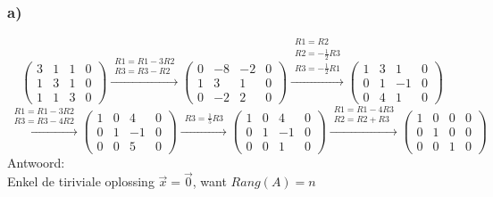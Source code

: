\documentclass[11pt]{article}
\begin{document}
\subsubsection*{a)}
\[
\left(
\begin{array}{ccc|c}
3 & 1 & 1 & 0 \\
1 & 3 & 1 & 0 \\
1 & 1 & 3 & 0
\end{array}
\right)
 \overset{\begin{matrix}
  R1 = R1-3R2 \\
  R3 = R3-R2
 \end{matrix}}{\rightarrow}
 \left(
\begin{array}{ccc|c}
0 & -8 & -2 & 0 \\
1 & 3 & 1 & 0 \\
0 & -2 & 2 & 0
\end{array}
\right)
 \overset{\begin{matrix}
  R1 = R2 \\
  R2 = -\frac{1}{2}R3 \\
  R3 = -\frac{1}{2}R1
 \end{matrix}}{\rightarrow}
 \left(
 \begin{array}{ccc|c}
1 & 3 & 1 & 0 \\
0 & 1 & -1 & 0 \\
0 & 4 & 1 & 0
\end{array}
\right)
\]
\[
\overset{\begin{matrix}
  R1 = R1-3R2 \\
  R3 = R3-4R2
 \end{matrix}}{\rightarrow}
 \left(
 \begin{array}{ccc|c}
1 & 0 & 4 & 0 \\
0 & 1 & -1 & 0 \\
0 & 0 & 5 & 0
\end{array}
\right)
 \overset{\begin{matrix}
  R3 = \frac{1}{5}R3
 \end{matrix}}{\rightarrow}
 \left(
 \begin{array}{ccc|c}
1 & 0 & 4 & 0 \\
0 & 1 & -1 & 0 \\
0 & 0 & 1 & 0
\end{array}
\right)
\overset{\begin{matrix}
  R1 = R1-4R3\\
  R2=R2+R3
 \end{matrix}}{\rightarrow}
 \left(
 \begin{array}{ccc|c}
1 & 0 & 0 & 0 \\
0 & 1 & 0 & 0 \\
0 & 0 & 1 & 0
\end{array}
\right)
\]
Antwoord:\\
Enkel de tiriviale oplossing $\vec{x} = \vec{0}$, want $Rang(A) = n$
\end{document}
